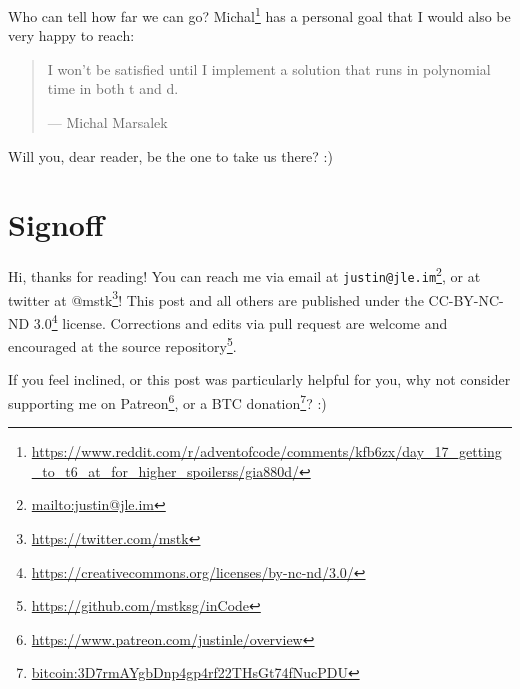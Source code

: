 \documentclass[]{article}
\renewcommand{\href}[2]{#2\footnote{\url{#1}}}
\begin{document}
Who can tell how far we can go?
\href{https://www.reddit.com/r/adventofcode/comments/kfb6zx/day_17_getting_to_t6_at_for_higher_spoilerss/gia880d/}{Michal}
has a personal goal that I would also be very happy to reach:

\begin{quote}
I won't be satisfied until I implement a solution that runs in polynomial time
in both t and d.

--- Michal Marsalek
\end{quote}

Will you, dear reader, be the one to take us there? :)

\hypertarget{signoff}{%
\section{Signoff}\label{signoff}}

Hi, thanks for reading! You can reach me via email at
\href{mailto:justin@jle.im}{\nolinkurl{justin@jle.im}}, or at twitter at
\href{https://twitter.com/mstk}{@mstk}! This post and all others are published
under the \href{https://creativecommons.org/licenses/by-nc-nd/3.0/}{CC-BY-NC-ND
3.0} license. Corrections and edits via pull request are welcome and encouraged
at \href{https://github.com/mstksg/inCode}{the source repository}.

If you feel inclined, or this post was particularly helpful for you, why not
consider \href{https://www.patreon.com/justinle/overview}{supporting me on
Patreon}, or a \href{bitcoin:3D7rmAYgbDnp4gp4rf22THsGt74fNucPDU}{BTC donation}?
:)
\end{document}
